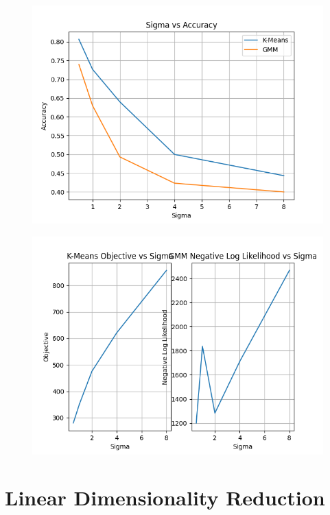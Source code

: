 \documentclass[a4paper]{article}
\theoremstyle{definition}
\newenvironment{soln}{
    \leavevmode\color{blue}\ignorespaces
}{}
\begin{document}
\begin{soln}
    \begin{figure}[h]
        \centering
        \includegraphics[width=1.0\textwidth]{images/sigmavsacc.png}
    \end{figure}
    \begin{figure}[h]
        \centering
        \includegraphics[width=1.0\textwidth]{images/objective.png}
    \end{figure}
\end{soln}



\newpage
\section{Linear Dimensionality Reduction}
\end{document}
